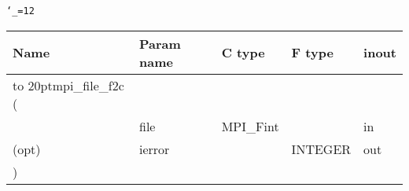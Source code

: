 \begingroup\tt\catcode`\_=12
\begin{tabular}{lllll}
\toprule
\textrm{Name}&\textrm{Param name}&\textrm{C type}&\textrm{F type}&\textrm{inout}\\
\midrule
\hbox to 20pt{mpi_file_f2c (\hss} \\
&file&MPI_Fint&&in\\
(opt)&ierror&&INTEGER&out\\
)\\
\bottomrule
\end{tabular}
\endgroup

